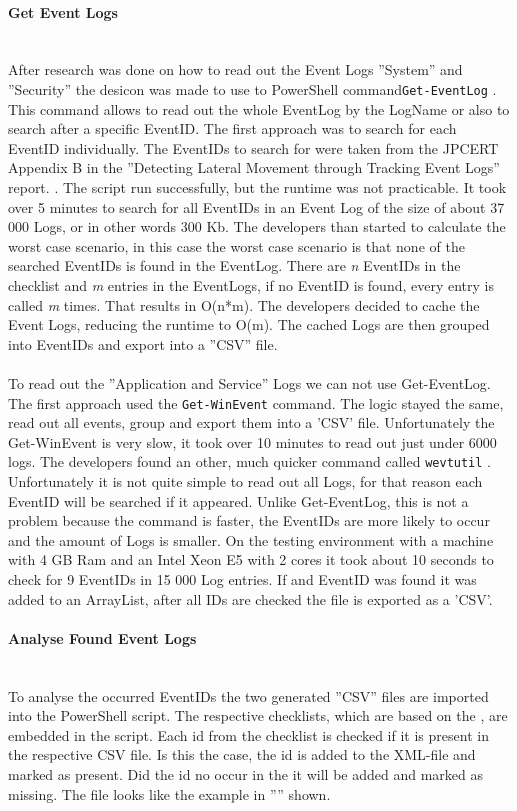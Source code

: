 \paragraph{Get Event Logs}\ \\
After research was done on how to read out the Event Logs ''System'' and ''Security'' the desicon was made to use to PowerShell command\lstinline|Get-EventLog| \cite{Get-EventLogs}. This command allows to read out the whole EventLog by the LogName or also to search after a specific EventID. The first approach was to search for each EventID individually. The EventIDs to search for were taken from the JPCERT Appendix B in the ''Detecting Lateral Movement through Tracking Event Logs'' report. \cite{JPCERTDetectingLateralMovement}. The script run successfully, but the runtime was not practicable. It took over 5 minutes to search for all EventIDs in an Event Log of the size of about 37 000 Logs, or  in other words 300 Kb. The developers than started to calculate the worst case scenario, in this case the worst case scenario is that none of the searched EventIDs is found in the EventLog. There are \textit{n} EventIDs in the checklist and \textit{m} entries in the EventLogs, if no EventID is found, every entry is called \textit{m} times. That results in O(n*m). The developers decided to cache the Event Logs, reducing the runtime to O(m). The cached Logs are then grouped into EventIDs and export into a ''CSV'' file. \ \\
\ \\
To read out the ''Application and Service'' Logs we can not use Get-EventLog. The first approach used the \lstinline|Get-WinEvent| \cite{Get-WinEvent} command. The logic stayed the same, read out all events, group and export them into a 'CSV' file. Unfortunately the Get-WinEvent is very slow, it took over 10 minutes to read out just under 6000 logs.
The developers found an other, much quicker command called \lstinline|wevtutil| \cite{wevtutil}. Unfortunately it is not quite simple to read out all Logs, for that reason each EventID will be searched if it appeared. Unlike Get-EventLog, this is not a problem because the command is faster, the EventIDs are more likely to occur and the amount of Logs is smaller. On the testing environment with a machine with 4 GB Ram and an Intel Xeon E5 with 2 cores it took about 10 seconds to check for 9 EventIDs in 15 000 Log entries. If and EventID was found it was added to an ArrayList, after all IDs are checked the file is exported as a 'CSV'.
\paragraph{Analyse Found Event Logs} \ \\
To analyse the occurred EventIDs the two generated ''CSV'' files are imported into the PowerShell script. The respective checklists, which are based on the , are embedded in the script. Each id from the checklist is checked if it is present in the respective CSV file. Is this the case, the id is added to the XML-file and marked as present. Did the id no occur in the it will be added and marked as missing. The file looks like the example in '''' shown.
\clearpage


